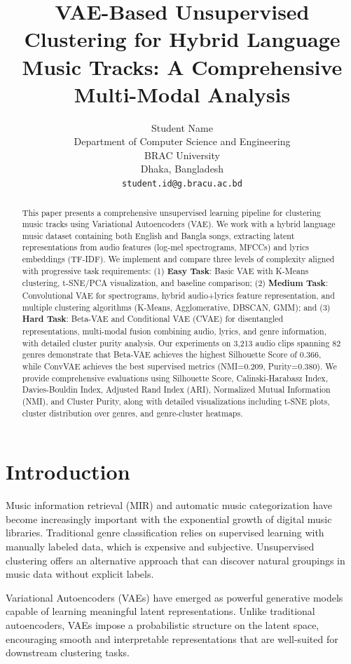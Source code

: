 \documentclass{article}
\title{VAE-Based Unsupervised Clustering for Hybrid Language Music Tracks: A Comprehensive Multi-Modal Analysis}
\author{%
  Student Name \\
  Department of Computer Science and Engineering\\
  BRAC University\\
  Dhaka, Bangladesh \\
  \texttt{student.id@g.bracu.ac.bd}
}
\begin{document}
\maketitle

\begin{abstract}
This paper presents a comprehensive unsupervised learning pipeline for clustering music tracks using Variational Autoencoders (VAE). We work with a hybrid language music dataset containing both English and Bangla songs, extracting latent representations from audio features (log-mel spectrograms, MFCCs) and lyrics embeddings (TF-IDF). We implement and compare three levels of complexity aligned with progressive task requirements: (1) \textbf{Easy Task}: Basic VAE with K-Means clustering, t-SNE/PCA visualization, and baseline comparison; (2) \textbf{Medium Task}: Convolutional VAE for spectrograms, hybrid audio+lyrics feature representation, and multiple clustering algorithms (K-Means, Agglomerative, DBSCAN, GMM); and (3) \textbf{Hard Task}: Beta-VAE and Conditional VAE (CVAE) for disentangled representations, multi-modal fusion combining audio, lyrics, and genre information, with detailed cluster purity analysis. Our experiments on 3,213 audio clips spanning 82 genres demonstrate that Beta-VAE achieves the highest Silhouette Score of 0.366, while ConvVAE achieves the best supervised metrics (NMI=0.209, Purity=0.380). We provide comprehensive evaluations using Silhouette Score, Calinski-Harabasz Index, Davies-Bouldin Index, Adjusted Rand Index (ARI), Normalized Mutual Information (NMI), and Cluster Purity, along with detailed visualizations including t-SNE plots, cluster distribution over genres, and genre-cluster heatmaps.
\end{abstract}

\section{Introduction}

Music information retrieval (MIR) and automatic music categorization have become increasingly important with the exponential growth of digital music libraries. Traditional genre classification relies on supervised learning with manually labeled data, which is expensive and subjective. Unsupervised clustering offers an alternative approach that can discover natural groupings in music data without explicit labels.

Variational Autoencoders (VAEs) have emerged as powerful generative models capable of learning meaningful latent representations. Unlike traditional autoencoders, VAEs impose a probabilistic structure on the latent space, encouraging smooth and interpretable representations that are well-suited for downstream clustering tasks.
\end{document}
